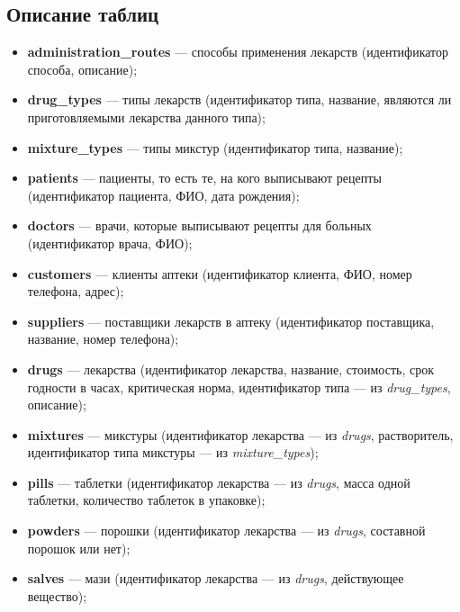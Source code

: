 \documentclass[a4paper]{article}
\newcommand{\dbtable}[1]{\textbf{#1}}
\newcommand{\dbtableref}[1]{\textit{#1}}
\begin{document}
		\subsection{Описание таблиц}
			\begin{itemize}
				\item \dbtable{administration\_routes} --- способы применения лекарств (идентификатор способа, описание);
				
				\item \dbtable{drug\_types} --- типы лекарств (идентификатор типа, название, являются ли приготовляемыми лекарства данного типа);
				
				\item \dbtable{mixture\_types} --- типы микстур (идентификатор типа, название);
				
				\item \dbtable{patients} --- пациенты, то есть те, на кого выписывают рецепты (идентификатор пациента, ФИО, дата рождения);
				
				\item \dbtable{doctors} --- врачи, которые выписывают рецепты для больных (идентификатор врача, ФИО);
				
				\item \dbtable{customers} --- клиенты аптеки (идентификатор клиента, ФИО, номер телефона, адрес);
				
				\item \dbtable{suppliers} --- поставщики лекарств в аптеку (идентификатор поставщика, название, номер телефона);
				
				\item \dbtable{drugs} --- лекарства (идентификатор лекарства, название, стоимость, срок годности в часах, критическая норма, идентификатор типа --- из \dbtableref{drug\_types}, описание);
				
				\item \dbtable{mixtures} --- микстуры (идентификатор лекарства --- из \dbtableref{drugs}, растворитель, идентификатор типа микстуры --- из \dbtableref{mixture\_types});
				
				\item \dbtable{pills} --- таблетки (идентификатор лекарства --- из \dbtableref{drugs}, масса одной таблетки, количество таблеток в упаковке);
				
				\item \dbtable{powders} --- порошки (идентификатор лекарства --- из \dbtableref{drugs}, составной порошок или нет);
					
				\item \dbtable{salves} --- мази (идентификатор лекарства --- из \dbtableref{drugs}, действующее вещество);
				

\end{itemize}
\end{document}

